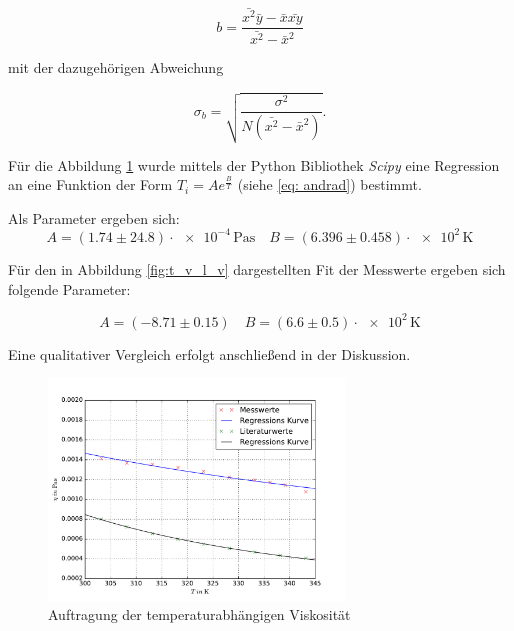 \begin{equation*}
b=\frac{\bar{x^2}\bar{y}-\bar{x}\bar{xy}}{\bar{x^2}-\bar{x}^2}
\end{equation*}

mit der dazugehörigen Abweichung

\begin{equation*}
\sigma_b=\sqrt{\frac{\sigma^2}{N\left(\bar{x^2}-\bar{x}^2\right)}}.
\end{equation*}

Für die Abbildung \ref{fig:t_v_v} wurde mittels der Python Bibliothek \emph{Scipy} eine
Regression an eine Funktion der Form $T_i = Ae^{\frac{B}{T}}$ (siehe \eqref{eq: andrad}) bestimmt. %

Als Parameter ergeben sich:
\begin{equation}
 \label{eq:reg_wert} %
A=\left(\num{1.74}\pm\num{24.8}\right)\cdot\num{e-4}\,\si{\pascal\second} \quad B=\left(\num{6.396} \pm\num{0.458}\right)\cdot\num{e+2}\,\si{\kelvin} %
\end{equation}

Für den in Abbildung \ref{fig:t_v_l_v} dargestellten Fit der Messwerte ergeben sich
folgende Parameter:

\begin{equation}
\label{eq:lreg}
A=\left(\num{-8.71}\pm\num{0.15}\right) \quad B=\left(\num{6.6} \pm\num{0.5}\right)\cdot\num{e+2}\,\si{\kelvin} 
\end{equation}

Eine qualitativer Vergleich erfolgt anschließend in der Diskussion. %

\FloatBarrier
\begin{figure}
\centering
\includegraphics[width=0.7\textwidth]{pics/viskositaet_temp_mit_lit.pdf}
\caption{Auftragung der temperaturabhängigen Viskosität} %
\label{fig:t_v_v}
\end{figure}

